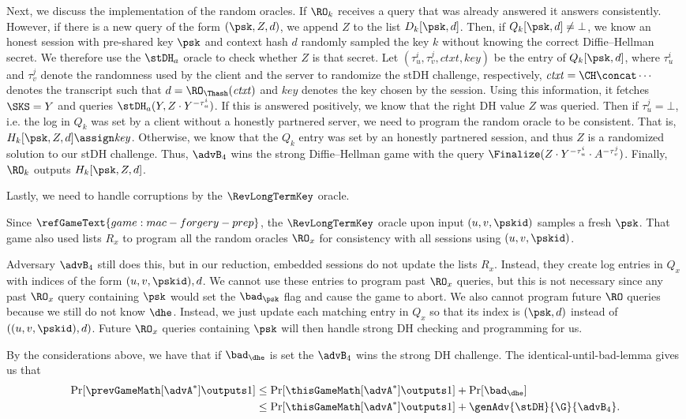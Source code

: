 Next, we discuss the implementation of the random oracles.
If $\RO_k$ receives a query that was already answered it answers consistently.
However, if there is a new query of the form $(\psk, Z, d)$, we append $Z$ to the list $D_k[\psk, d]$.
Then, if $Q_k[\psk, d] \neq \bot$, we know an honest session with pre-shared key $\psk$ and context hash $d$ randomly sampled the key $k$ without knowing the correct Diffie--Hellman secret.
We therefore use the $\stDH_a$ oracle to check whether $Z$ is that secret.
Let $(\tau_u^i, \tau_v^j, \mathit{ctxt}, \mathit{key})$ be the entry of $Q_k[\psk, d]$, where $\tau_u^i$ and $\tau_v^j$ denote the randomness used by the client and the server to randomize the stDH challenge, respectively, $\mathit{ctxt} = \CH \concat \dotsb$ denotes the transcript such that $d = \RO_\Thash(\mathit{ctxt})$ and $\mathit{key}$ denotes the key chosen by the session.
Using this information, it fetches $\SKS = Y$ and queries $\stDH_a(Y, Z \cdot Y^{-\tau_u^i})$.
If this is answered positively, we know that the right DH value $Z$ was queried.
Then if $\tau_u^j = \bot$, i.e. the log in $Q_k$ was set by a client without a honestly partnered server, we need to program the random oracle to be consistent.
That is, $H_k[\psk, Z, d] \assign \mathit{key}$.
Otherwise, we know that the $Q_k$ entry was set by an honestly partnered session, and thus $Z$ is a randomized solution to our stDH challenge.
Thus, $\advB_4$ wins the strong Diffie--Hellman game with the query $\Finalize(Z \cdot Y^{-\tau_u^i} \cdot A^{-\tau_v^j})$.
Finally, $\RO_k$ outputs $H_k[\psk, Z, d]$.

Lastly, we need to handle corruptions by the $\RevLongTermKey$ oracle.

Since $\refGameText{game:mac-forgery-prep}$, the $\RevLongTermKey$ oracle upon input $(u, v, \pskid)$ samples a fresh $\psk$.
That game also used lists $R_x$ to program all the random oracles $\RO_{x}$ for consistency with all sessions using $(u,v, \pskid)$.

Adversary $\advB_4$ still does this, but in our reduction, embedded sessions do not update the lists $R_x$. 
Instead, they create log entries in $Q_x$ with indices of the form $(u,v,\pskid), d$. 
We cannot use these entries to program past $\RO_x$ queries, but this is not necessary since any past $\RO_x$ query containing $\psk$ would set the $\bad_{\psk}$ flag and cause the game to abort.
We also cannot program future $\RO$ queries because we still do not know $\dhe$. 
Instead, we just update each matching entry in $Q_x$ so that its index is $(\psk, d)$ instead of $((u, v, \pskid), d)$. 
Future $\RO_x$ queries containing $\psk$ will then handle strong DH checking and programming for us.

By the considerations above, we have that if $\bad_\dhe$ is set the $\advB_4$ wins the strong DH challenge.
The identical-until-bad-lemma gives us that
\begin{align} \nonumber
\Pr[ \prevGameMath[\advA^*] \outputs 1 ] &\leq \Pr[ \thisGameMath[\advA^*] \outputs 1 ] + \Pr[ \bad_\dhe ] \\
&\leq \Pr[ \thisGameMath[\advA^*] \outputs 1 ] + \genAdv{\stDH}{\G}{\advB_4}.
\end{align}




